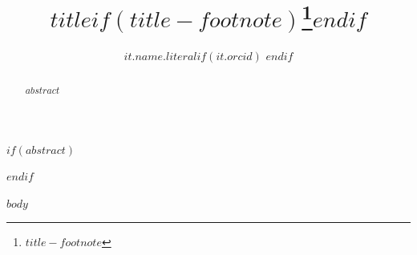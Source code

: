 \documentclass[
  manuscript=$if(manuscript)$$manuscript$$else$article$endif$,
  layout=$if(layout)$$layout$$else$preprint$endif$,
  year=$if(year)$$year$$else$20xx$endif$,
  volume=$if(volume)$$volume$$else$x$endif$,
]{den}
\title{$title$$if(title-footnote)$\footnote{$title-footnote$}$endif$}
\author{$it.name.literal$$if(it.orcid)$ \orcid{$it.orcid$}$endif$}
\affiliation{$it.name$}
\begin{document}
$if(abstract)$
\begin{abstract}
$abstract$
\end{abstract}
$endif$

$body$
\end{document}
